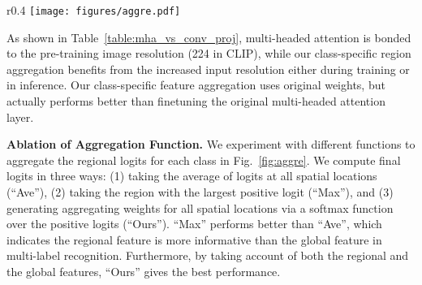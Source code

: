 \begin{wrapfigure}{r}{0.4\textwidth}
\centering
\vspace{-10pt}
\texttt{[image: figures/aggre.pdf]}
    \caption{\small{Comparison among different aggregations on MS-COCO using partial labels.}}
\label{fig:aggre}
\vspace{-0.3cm}
\end{wrapfigure}

As shown in Table~\ref{table:mha_vs_conv_proj}, multi-headed attention is bonded to the pre-training image resolution (224 in CLIP), while our class-specific region aggregation benefits from the increased input resolution either during training or in inference. Our class-specific feature aggregation uses original weights, but actually performs better than finetuning the original multi-headed attention layer.

\textbf{Ablation of Aggregation Function.} We experiment with different functions to aggregate the regional logits for each class in Fig.~\ref{fig:aggre}. We compute final logits in three ways: (1) taking the average of logits at all spatial locations (``Ave''), (2) taking the region with the largest positive logit (``Max''), and (3) generating aggregating weights for all spatial locations via a softmax function over the positive logits (``Ours'').  ``Max'' performs better than ``Ave'', which indicates the regional feature is more informative than the global feature in multi-label recognition. Furthermore, by taking account of both the regional and the global features, ``Ours'' gives the best performance.



